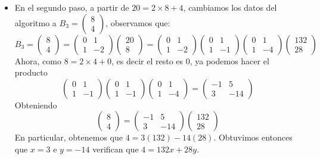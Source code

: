 \documentclass{report}
\begin{document}
{\begin{itemize}
		\item En el segundo paso, a partir de $20=2\times 8+4$, cambiamos los datos del algoritmo a $B_3=\begin{pmatrix} 8\\4 \end{pmatrix} $, observamos que: $$B_3=\begin{pmatrix} 8\\4 \end{pmatrix}=\begin{pmatrix} 0&1\\1&-2 \end{pmatrix} \begin{pmatrix} 20\\8 \end{pmatrix}=\begin{pmatrix} 0&1\\1&-2 \end{pmatrix}\begin{pmatrix} 0&1\\1&-1 \end{pmatrix} \begin{pmatrix} 0&1\\1&-4 \end{pmatrix} \begin{pmatrix} 132\\28 \end{pmatrix}  $$
		      Ahora, como $8=2\times 4+0$, es decir el resto es 0, ya podemos hacer el producto $$\begin{pmatrix} 0&1\\1&-1 \end{pmatrix}\begin{pmatrix} 0&1\\1&-1 \end{pmatrix} \begin{pmatrix} 0&1\\1&-4 \end{pmatrix}=\begin{pmatrix} -1&5\\3&-14 \end{pmatrix}  $$
		      Obteniendo $$\begin{pmatrix} 8\\4 \end{pmatrix}=\begin{pmatrix} -1&5\\3&-14 \end{pmatrix} \begin{pmatrix} 132\\28 \end{pmatrix}$$
		      En particular, obtenemos que $4=3(132)-14(28)$. Obtuvimos entonces que $x=3$ e $y=-14$ verifican que $4=132x+28y$.
	\end{itemize}}
\end{document}
